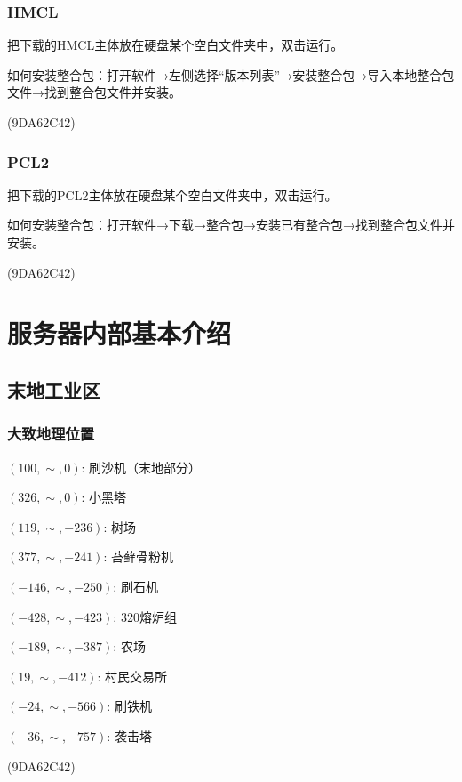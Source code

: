 \documentclass[UTF8,a4paper]{article}
\begin{document}
			\subsubsection{HMCL}
				\par 把下载的HMCL主体放在硬盘某个空白文件夹中，双击运行。
				\par 如何安装整合包：打开软件→左侧选择“版本列表”→安装整合包→导入本地整合包文件→找到整合包文件并安装。
				\begin{flushright}(9DA62C42)\end{flushright}
			\subsubsection{PCL2}
				\par 把下载的PCL2主体放在硬盘某个空白文件夹中，双击运行。
				\par 如何安装整合包：打开软件→下载→整合包→安装已有整合包→找到整合包文件并安装。
				\begin{flushright}(9DA62C42)\end{flushright}
	\section{服务器内部基本介绍}
		\subsection{末地工业区}
			\subsubsection{大致地理位置}
				\par $(100,\sim,0)$: 刷沙机（末地部分）
				\par $(326,\sim,0)$: 小黑塔
				\par $(119,\sim,-236)$: 树场
				\par $(377,\sim,-241)$: 苔藓骨粉机
				\par $(-146,\sim,-250)$: 刷石机
				\par $(-428,\sim,-423)$: 320熔炉组
				\par $(-189,\sim,-387)$: 农场
				\par $(19,\sim,-412)$: 村民交易所
				\par $(-24,\sim,-566)$: 刷铁机
				\par $(-36,\sim,-757)$: 袭击塔
				\begin{flushright}(9DA62C42)\end{flushright}
\end{document}
